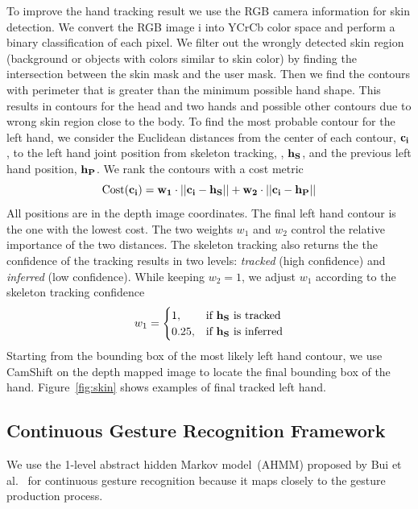 \documentclass{sig-alternate}
\begin{document}
To improve the hand tracking result we use the RGB camera information for skin
detection. We convert the RGB image i into YCrCb color space and perform a
binary classification of each pixel. We filter out the wrongly detected skin
region (background or objects with colors similar to skin color) by finding the
intersection between the skin mask and the user mask. Then we find the contours
with perimeter that is greater than the minimum possible hand shape. This
results in contours for the head and two hands and possible other contours due
to wrong skin region close to the body. To find the most probable contour for
the left hand, we consider the Euclidean distances from the center of each
contour, $\bf{c}_i$, to the left hand joint position from skeleton
tracking, , $\bf{h}_S$, and the previous left hand position, $\bf{h}_P$. We rank
the contours with a cost metric
\begin{displaymath}
\text{Cost}(\bf{c}_i) = w_1 \cdot ||\bf{c}_i - \bf{h}_S|| + w_2 \cdot ||\bf{c}_i
- \bf{h}_P||
\end{displaymath}
All positions are in the depth image coordinates. The final left hand contour is
the one with the lowest cost.
The two weights $w_1$ and $w_2$ control the relative importance of the two distances. The
skeleton tracking also returns the the confidence of the tracking results in two
levels: \textit{tracked} (high confidence) and \textit{inferred} (low
confidence). While keeping $w_2 = 1$, we adjust $w_1$ according to the skeleton
tracking confidence
\begin{displaymath}
w_1 = 
\begin{cases}
  1, & \text{if } \bf{h}_S \text{ is tracked} \\
  0.25, & \text{if } \bf{h}_S \text{ is inferred} 
\end{cases}
\end{displaymath}
Starting from the bounding box of the most likely left hand
contour, we use CamShift \cite{Bradski98} on the depth mapped image
to locate the final bounding box of the hand. Figure~\ref{fig:skin} shows
examples of final tracked left hand.

\subsection{Continuous Gesture Recognition Framework}
We use the 1-level abstract hidden Markov model (AHMM)
proposed by Bui et al.~\cite{bui00} for continuous gesture recognition because
it maps closely to the gesture production process. 
\end{document}
